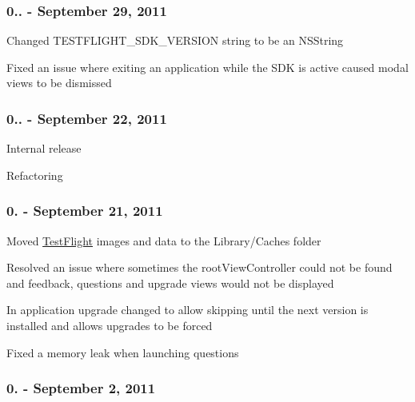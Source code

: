 \subsubsection*{0.. -\/ September 29, 2011}


\begin{DoxyItemize}
\item Changed {\ttfamily T\-E\-S\-T\-F\-L\-I\-G\-H\-T\-\_\-\-S\-D\-K\-\_\-\-V\-E\-R\-S\-I\-O\-N} string to be an {\ttfamily N\-S\-String}
\item Fixed an issue where exiting an application while the S\-D\-K is active caused modal views to be dismissed
\end{DoxyItemize}

\subsubsection*{0.. -\/ September 22, 2011}


\begin{DoxyItemize}
\item Internal release
\item Refactoring
\end{DoxyItemize}

\subsubsection*{0. -\/ September 21, 2011}


\begin{DoxyItemize}
\item Moved \hyperlink{interface_test_flight}{Test\-Flight} images and data to the Library/\-Caches folder
\item Resolved an issue where sometimes the root\-View\-Controller could not be found and feedback, questions and upgrade views would not be displayed
\item In application upgrade changed to allow skipping until the next version is installed and allows upgrades to be forced
\item Fixed a memory leak when launching questions
\end{DoxyItemize}

\subsubsection*{0. -\/ September 2, 2011}


